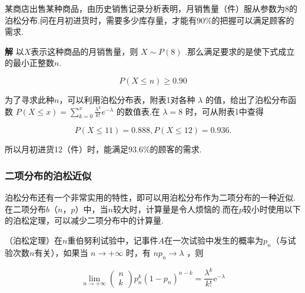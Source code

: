 \begin{example}
	某商店出售某种商品，由历史销售记录分析表明，月销售量（件）服从参数为8的泊松分布.问在月初进货时，需要多少库存量，才能有$ 90\% $的把握可以满足顾客的需求.
	
	\textbf{解}
	以$ X $表示这种商品的月销售量，则 $X \sim P(8)$ .那么满足要求的是使下式成立的最小正整数$ n $.
	
	\[
	P(X \leqslant n) \geqslant 0.90
	\]
	
	为了寻求此种$ n $，可以利用泊松分布表，附表1对各种 $\lambda$ 的值，给出了泊松分布函数 $P(X \leqslant x)=\sum_{k=0}^{x} \frac{\lambda^{k}}{k !} e^{-\lambda}$ 的数值表.在 $\lambda=8$ 时，可从附表1中查得
	
	\[
	P(X \leqslant 11)=0.888, P(X \leqslant 12)=0.936 .
	\]
	
	所以月初进货12（件）时，能满足$ 93.6\% $的顾客的需求.
\end{example}

\subsubsection{二项分布的泊松近似}

泊松分布还有一个非常实用的特性，即可以用泊松分布作为二项分布的一种近似.在二项分布$ b（n，p） $中，当$ n $较大时，计算量是令人烦恼的.而在$ p $较小时使用以下的泊松定理，可以减少二项分布中的计算量.

\begin{theorem}
	（泊松定理）在$ n $重伯努利试验中，记事件$ A $在一次试验中发生的概率为$ p_{n} $（与试验次数$ n $有关），如果当 $n \rightarrow+\infty$ 时，有 $n p_{n} \rightarrow \lambda$ ，则
	
	\begin{equation}
	\lim _{n \rightarrow+\infty} \left( \begin{array}{l}{n} \\ {k}\end{array}\right) p_{n}^{k}\left(1-p_{n}\right)^{n-k}=\frac{\lambda^{k}}{k !} \mathrm{e}^{-\lambda} \label{eq:2.4.4}
	\end{equation}
	
\end{theorem}

